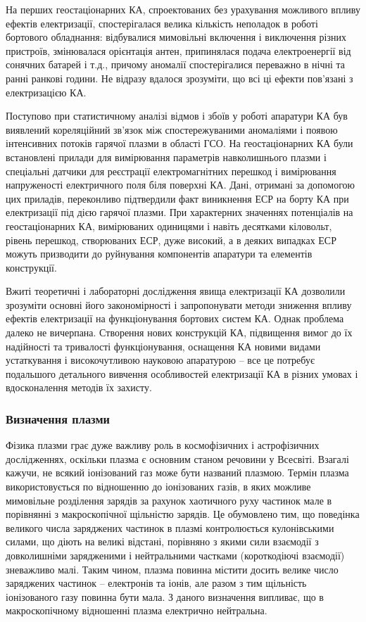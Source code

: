 \documentclass[a4paper,12pt]{article}
\begin{document}
На перших геостаціонарних КА, спроектованих без урахування можливого впливу ефектів електризації, спостерігалася велика кількість неполадок в роботі бортового обладнання: відбувалися мимовільні включення і виключення різних пристроїв, змінювалася орієнтація антен, припинялася подача електроенергії від сонячних батарей і т.д., причому аномалії спостерігалися переважно в нічні та ранні ранкові години. Не відразу вдалося зрозуміти, що всі ці ефекти пов'язані з електризацією КА.

Поступово при статистичному аналізі відмов і збоїв у роботі апаратури КА був виявлений кореляційний зв'язок між спостережуваними аномаліями і появою інтенсивних потоків гарячої плазми в області ГСО. На геостаціонарних КА були встановлені прилади для вимірювання параметрів навколишнього плазми і спеціальні датчики для реєстрації електромагнітних перешкод і вимірювання напруженості електричного поля біля поверхні КА. Дані, отримані за допомогою цих приладів, переконливо підтвердили факт виникнення ЕСР на борту КА при електризації під дією гарячої плазми. При характерних значеннях потенціалів на геостаціонарних КА, вимірюваних одиницями і навіть десятками кіловольт, рівень перешкод, створюваних ЕСР, дуже високий, а в деяких випадках ЕСР можуть призводити до руйнування компонентів апаратури та елементів конструкції.

Вжиті теоретичні і лабораторні дослідження явища електризації КА дозволили зрозуміти основні його закономірності і запропонувати методи зниження впливу ефектів електризації на функціонування бортових систем КА. Однак проблема далеко не вичерпана. Створення нових конструкцій КА, підвищення вимог до їх надійності та тривалості функціонування, оснащення КА новими видами устаткування і високочутливою науковою апаратурою -- все це потребує подальшого детального вивчення особливостей електризації КА в різних умовах і вдосконалення методів їх захисту.\cite{novikov}

\subsubsection{Визначення плазми}
Фізика плазми грає дуже важливу роль в космофізичних і астрофізичних дослідженнях, оскільки плазма є основним станом речовини у Всесвіті. Взагалі кажучи, не всякий іонізований газ може бути названий плазмою. Термін плазма використовується по відношенню до іонізованих газів, в яких можливе мимовільне розділення зарядів за рахунок хаотичного руху частинок мале в порівнянні з макроскопічної щільністю зарядів. Це обумовлено тим, що поведінка великого числа заряджених частинок в плазмі контролюється кулонівськими силами, що діють на великі відстані, порівняно з якими сили взаємодії з довколишніми зарядженими і нейтральними частками (короткодіючі взаємодії) зневажливо малі. Таким чином, плазма повинна містити досить велике число заряджених частинок -- електронів та іонів, але разом з тим щільність іонізованого газу повинна бути мала. З даного визначення випливає, що в макроскопічному відношенні плазма електрично нейтральна.
\end{document}
